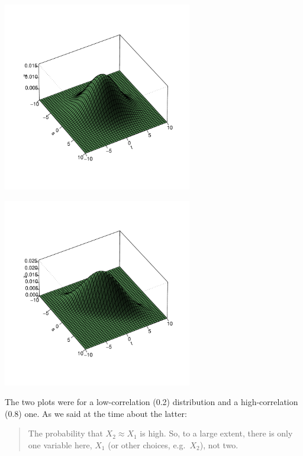 \begin{minipage}[b]{0.65\linewidth}
    \mbox{\includegraphics[width=3.25in]{Images/Rho2.pdf}} 
\end{minipage}
\hspace{0.0in}
\begin{minipage}[b]{0.65\linewidth}
    \mbox{\includegraphics[width=3.25in]{Images/Rho8.pdf}} 
\end{minipage}

The two plots were for a low-correlation (0.2) distribution and a
high-correlation (0.8) one.  As we said at the time about the latter:

\begin{quote}

The probability that $X_2 \approx X_1$ is high.  So, to a large extent,
there is only one variable here, $X_1$ (or other choices, e.g.\ $X_2$),
not two.  

\end{quote}

